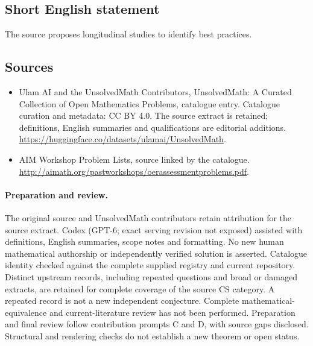 \documentclass[11pt]{article}
\begin{document}
\subsection{Short English statement}
The source proposes longitudinal studies to identify best practices.
\subsection{Sources}
\begin{itemize}
\item[\hypertarget{source:statement:1}{S1}] Ulam AI and the UnsolvedMath Contributors, UnsolvedMath: A Curated Collection of Open Mathematics Problems, catalogue entry. Catalogue curation and metadata: CC BY 4.0. The source extract is retained; definitions, English summaries and qualifications are editorial additions.
\url{https://huggingface.co/datasets/ulamai/UnsolvedMath}.
\item[\hypertarget{source:statement:2}{S2}] AIM Workshop Problem Lists, source linked by the catalogue.
\url{http://aimath.org/pastworkshops/oerassessmentproblems.pdf}.
\end{itemize}
\paragraph{Preparation and review.}
The original source and UnsolvedMath contributors retain attribution for the source extract. Codex (GPT-6; exact serving revision not exposed) assisted with definitions, English summaries, scope notes and formatting. No new human mathematical authorship or independently verified solution is asserted. Catalogue identity checked against the complete supplied registry and current repository. Distinct upstream records, including repeated questions and broad or damaged extracts, are retained for complete coverage of the source CS category. A repeated record is not a new independent conjecture. Complete mathematical-equivalence and current-literature review has not been performed. Preparation and final review follow contribution prompts C and D, with source gaps disclosed. Structural and rendering checks do not establish a new theorem or open status.
\label{end:statement}
\end{document}
